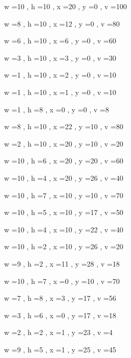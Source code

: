 \documentclass[11pt]{article}
\begin{document}
w =10 , h =10 , x =20 , y =0 , v =100
\par
w =8 , h =10 , x =12 , y =0 , v =80
\par
w =6 , h =10 , x =6 , y =0 , v =60
\par
w =3 , h =10 , x =3 , y =0 , v =30
\par
w =1 , h =10 , x =2 , y =0 , v =10
\par
w =1 , h =10 , x =1 , y =0 , v =10
\par
w =1 , h =8 , x =0 , y =0 , v =8
\par
w =8 , h =10 , x =22 , y =10 , v =80
\par
w =2 , h =10 , x =20 , y =10 , v =20
\par
w =10 , h =6 , x =20 , y =20 , v =60
\par
w =10 , h =4 , x =20 , y =26 , v =40
\par
w =10 , h =7 , x =10 , y =10 , v =70
\par
w =10 , h =5 , x =10 , y =17 , v =50
\par
w =10 , h =4 , x =10 , y =22 , v =40
\par
w =10 , h =2 , x =10 , y =26 , v =20
\par
w =9 , h =2 , x =11 , y =28 , v =18
\par
w =10 , h =7 , x =0 , y =10 , v =70
\par
w =7 , h =8 , x =3 , y =17 , v =56
\par
w =3 , h =6 , x =0 , y =17 , v =18
\par
w =2 , h =2 , x =1 , y =23 , v =4
\par
w =9 , h =5 , x =1 , y =25 , v =45
\par
\newpage


\end{document}
